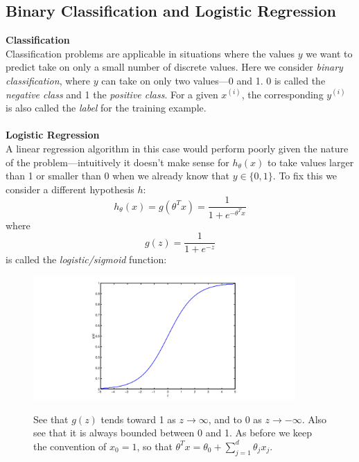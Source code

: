 \documentclass{report}
\begin{document}
\subsection{Binary Classification and Logistic Regression}
\textbf{Classification}\\
Classification problems are applicable in situations where the values $y$ we want to predict
take on only a small number of discrete values. Here we consider \textit{binary classification}, where 
$y$ can take on only two values---0 and 1. 0 is called
the \textit{negative class} and 1 the \textit{positive class}. For a given $x^{(i)}$, the corresponding 
$y^{(i)}$ is also called the \textit{label} for the training example.\\
\vspace{1mm}\\
\textbf{Logistic Regression}\\
A linear regression algorithm in this case would perform poorly given the nature of the problem---intuitively
it doesn't make sense for $h_\theta(x)$ to take values larger than 1 or smaller than 0 when
we already know that $y\in\{0,1\}$. To fix this we consider a different hypothesis $h$:
\begin{equation*}
h_\theta(x)=g(\theta^Tx)=\frac{1}{1+e^{-\theta^Tx}}
\end{equation*}
where 
\begin{equation*}
g(z)=\frac{1}{1+e^{-z}}
\end{equation*}
is called the \textit{logistic/sigmoid} function:
\begin{figure}[h]
\begin{center}
\includegraphics[width=10cm]{1}\\
\end{center}
See that $g(z)$ tends toward 1 as $z\to\infty$, and to 0 as $z\to-\infty$. Also see
that it is always bounded between 0 and 1. As before we keep the convention of $x_0=1$, so that
$\theta^Tx=\theta_0+\sum^d_{j=1}\theta_jx_j$.
\end{figure}\\
\end{document}
